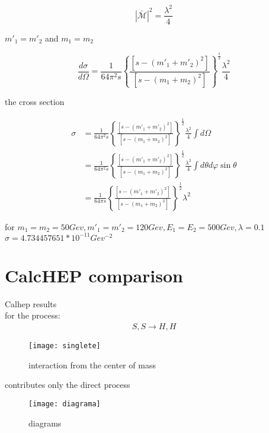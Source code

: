 \begin{equation}
  |\bar{ \mathcal{M} } |^2 = \frac{\lambda^2}{4}
\end{equation}

$m'_1 =m'_2 $ and $m_1 =m_2$  

\begin{equation}
  \frac{d\sigma}{d\Omega} = \frac{1}{64 \pi^2 s} \left\{ \frac{ [s-(m'_1 +m'_2)^2]}{[s-(m_1 + m_2)^2]} \right\}^{\frac{1}{2}}  \frac{\lambda^2}{4}  
\end{equation}

the cross section

\begin{equation}
  \begin{split}
    \sigma &= \frac{1}{64 \pi^2 s} \left\{ \frac{ [s-(m'_1 +m'_2)^2]}{[s-(m_1 + m_2)^2]} \right\}^{\frac{1}{2}}  \frac{\lambda^2}{4} \int{ d\Omega}\\
    &= \frac{1}{64 \pi^2 s} \left\{ \frac{ [s-(m'_1 +m'_2)^2]}{[s-(m_1 + m_2)^2]} \right\}^{\frac{1}{2}}  \frac{\lambda^2}{4} \int{ d\theta d\varphi \sin{\theta}}\\
    &= \frac{1}{64 \pi s} \left\{ \frac{ [s-(m'_1 +m'_2)^2]}{[s-(m_1 + m_2)^2]} \right\}^{\frac{1}{2}}  \lambda^2
  \end{split}
\end{equation}

for $m_1=m_2= 50  Gev, m'_1=m'_2=120  Gev,E_1=E_2=500  Gev, \lambda = 0.1$\\

$\sigma = 4.734457651 * 10^{-11} Gev^{-2}$

\section{CalcHEP comparison}

Calhep results\\

for the process:
\begin{align}
  S,S \to H,H 
\end{align}

\begin{figure}
  \centering
  \texttt{[image: singlete]}
  \caption{interaction from the center of mass}
\end{figure}

contributes only the direct process

\begin{figure}
  \centering
  \texttt{[image: diagrama]}
  \caption{diagrams}
\end{figure}

